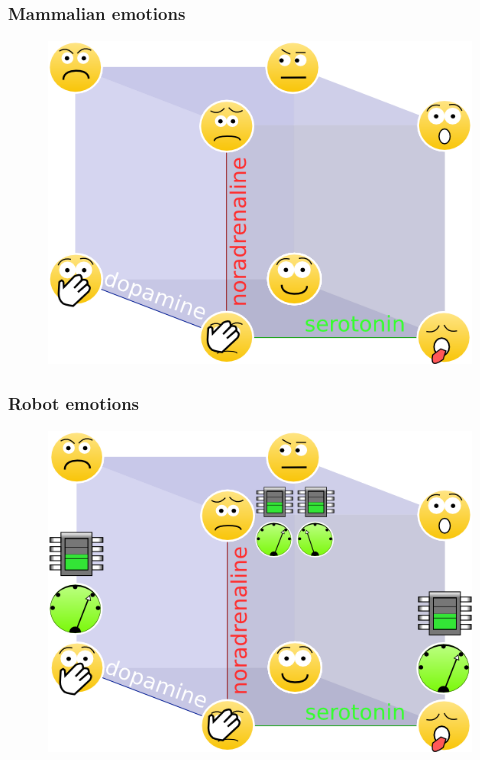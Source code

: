 \documentclass[12pt, aspectratio=169]{beamer}
\begin{document}
\begin{frame}
\frametitle{Mammalian emotions}
\begin{figure}
\includegraphics[width=0.7\linewidth]{cube_of_emotional_parameters}
\end{figure}
\end{frame}


\begin{frame}
\frametitle{Robot emotions}
\begin{figure}
\includegraphics[width=0.7\linewidth]{cube_of_emotional_parameters_machine}
\end{figure}
\end{frame}

\end{document}
